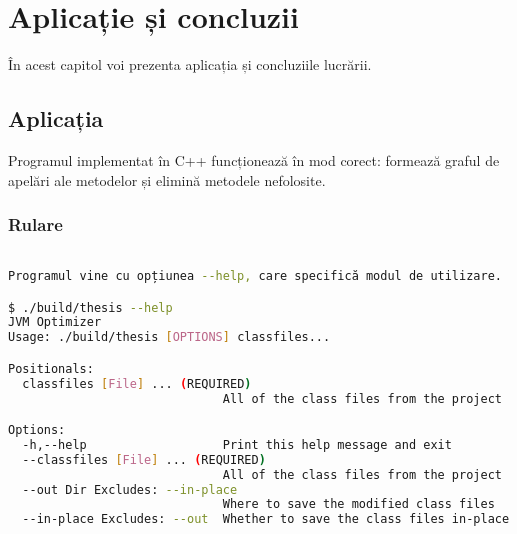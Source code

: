 \chapter {Aplicație și concluzii}

În acest capitol voi prezenta aplicația și concluziile lucrării.

\section {Aplicația}

Programul implementat în C++ funcționează în mod corect: formează graful de
apelări ale metodelor și elimină metodele nefolosite.

\subsection {Rulare}

\begin{lstlisting}[language=Bash]

Programul vine cu opțiunea --help, care specifică modul de utilizare.

$ ./build/thesis --help
JVM Optimizer
Usage: ./build/thesis [OPTIONS] classfiles...

Positionals:
  classfiles [File] ... (REQUIRED)
                              All of the class files from the project

Options:
  -h,--help                   Print this help message and exit
  --classfiles [File] ... (REQUIRED)
                              All of the class files from the project
  --out Dir Excludes: --in-place
                              Where to save the modified class files
  --in-place Excludes: --out  Whether to save the class files in-place

\end{lstlisting}


